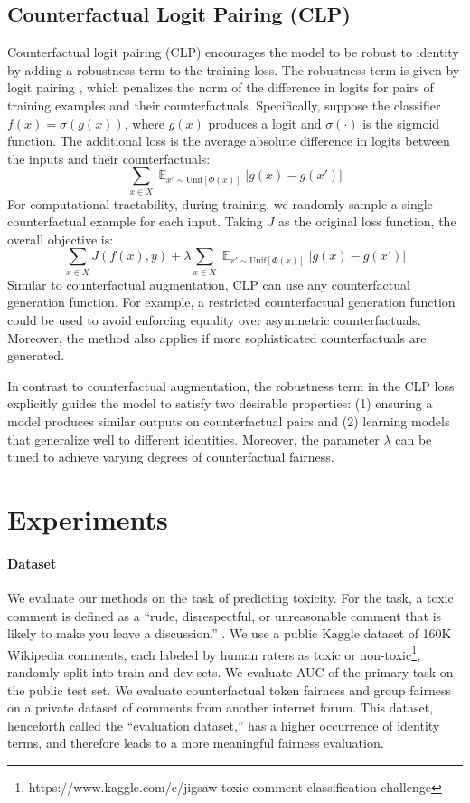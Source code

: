 \documentclass[letterpaper]{article} %
\theoremstyle{definition}
\begin{document}
\subsection{Counterfactual Logit Pairing (CLP)}
Counterfactual logit pairing (CLP) encourages the model to be robust to identity by adding a robustness term to the training loss. The robustness term is given by logit pairing \cite{ALP}, which penalizes the norm of the difference in logits for pairs of training examples and their counterfactuals.
Specifically, suppose the classifier $f(x) = \sigma(g(x))$, where $g(x)$ produces a logit and $\sigma(\cdot)$ is the sigmoid function. 
The additional loss is the average absolute difference in logits between the inputs and their counterfactuals: 
\[\sum_{x \in X}{\mathop{\mathbb{E}}_{x' \sim \text{Unif}[\Phi(x)]}|g(x) - g(x')|}\]
For computational tractability, during training, we randomly sample a single counterfactual example for each input. Taking $J$ as the original loss function, the overall objective is:
\[\sum_{x \in X}{J(f(x), y)} +  \lambda\sum_{x \in X}{\mathop{\mathbb{E}}_{x' \sim \text{Unif}[\Phi(x)]}|g(x) - g(x')|}\]
Similar to counterfactual augmentation, CLP can use any counterfactual generation function. For example, a restricted counterfactual generation function could be used to avoid enforcing equality over asymmetric counterfactuals. Moreover, the method also applies if more sophisticated counterfactuals are generated.

In contrast to counterfactual augmentation, the robustness term in the CLP loss explicitly guides the model to satisfy two desirable properties: (1) ensuring a model produces similar outputs on counterfactual pairs and (2) learning models that generalize well to different identities. 
Moreover, the parameter $\lambda$ can be tuned to achieve varying degrees of counterfactual fairness.


\section{Experiments} \label{experiments}
\paragraph{Dataset} We evaluate our methods on the task of predicting toxicity. For the task, a toxic comment is defined as a ``rude, disrespectful, or unreasonable comment that is likely to make you leave a discussion.'' \cite{Dixon18}. We use a public Kaggle dataset of 160K Wikipedia comments, each labeled by human raters as toxic or non-toxic\footnote{https://www.kaggle.com/c/jigsaw-toxic-comment-classification-challenge}, randomly split into train and dev sets. We evaluate AUC of the primary task on the public test set. We evaluate counterfactual token fairness and group fairness on a private dataset of comments from another internet forum. This dataset, henceforth called the ``evaluation dataset,'' has a higher occurrence of identity terms, and therefore leads to a more meaningful fairness evaluation.
\end{document}
